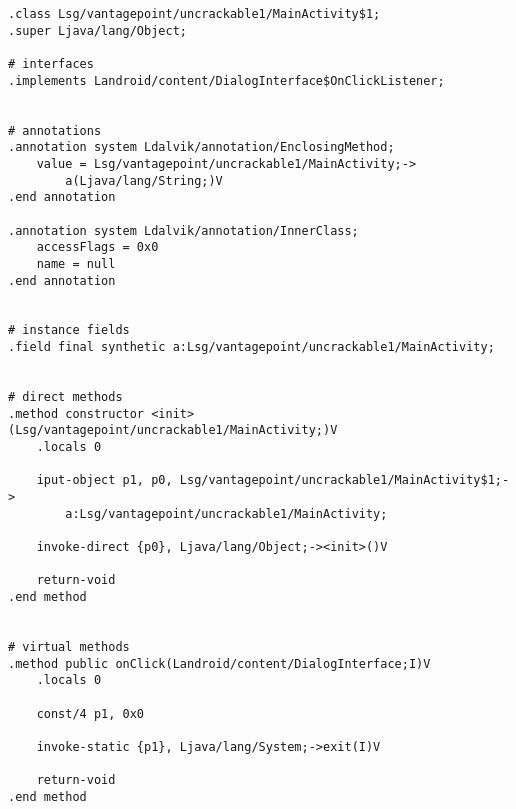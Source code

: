 \begin{verbatim}
.class Lsg/vantagepoint/uncrackable1/MainActivity$1;
.super Ljava/lang/Object;

# interfaces
.implements Landroid/content/DialogInterface$OnClickListener;


# annotations
.annotation system Ldalvik/annotation/EnclosingMethod;
    value = Lsg/vantagepoint/uncrackable1/MainActivity;->
        a(Ljava/lang/String;)V
.end annotation

.annotation system Ldalvik/annotation/InnerClass;
    accessFlags = 0x0
    name = null
.end annotation


# instance fields
.field final synthetic a:Lsg/vantagepoint/uncrackable1/MainActivity;


# direct methods
.method constructor <init>(Lsg/vantagepoint/uncrackable1/MainActivity;)V
    .locals 0

    iput-object p1, p0, Lsg/vantagepoint/uncrackable1/MainActivity$1;->
        a:Lsg/vantagepoint/uncrackable1/MainActivity;

    invoke-direct {p0}, Ljava/lang/Object;-><init>()V

    return-void
.end method


# virtual methods
.method public onClick(Landroid/content/DialogInterface;I)V
    .locals 0

    const/4 p1, 0x0

    invoke-static {p1}, Ljava/lang/System;->exit(I)V

    return-void
.end method
\end{verbatim}
